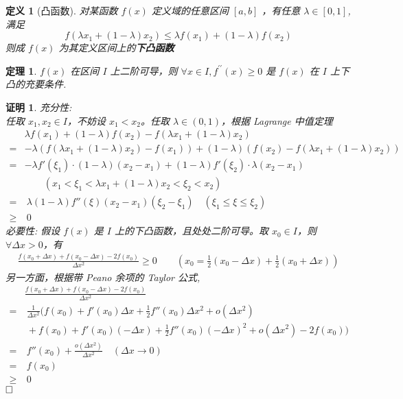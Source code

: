 \documentclass{ctexart}
\newcommand{\。}{．} %
\newcommand{\dds}{^{\prime\prime}}
\newenvironment{lvse}{
    \begin{tcolorbox}[enhanced, breakable, colback=qlv, boxrule=0pt, frame hidden,
        borderline west={0.7mm}{0.1mm}{slv}]
    }
    {\end{tcolorbox}}
\newenvironment{lanse}{
    \begin{tcolorbox}[enhanced, breakable, colback=qlan, boxrule=0pt, frame hidden,
        borderline west={0.7mm}{0.1mm}{slan}]
    }
    {\end{tcolorbox}}
\newenvironment{huangse}{
    \begin{tcolorbox}[enhanced, breakable, colback=qhuang, boxrule=0pt, frame hidden,
        borderline west={0.7mm}{0.1mm}{shuang}]
    }
    {\end{tcolorbox}}
\theoremstyle{t} %
\newtheorem{dyhj}{\color{slv} 定义}[subsection] %
\newtheorem{dlhj}{\color{shuang} 定理}[subsection]
\newtheorem*{zmhj}{\color{slan} 证明}
\newenvironment{dy}{\begin{lvse}\begin{dyhj}}{\end{dyhj}\end{lvse}}
\newenvironment{zm}{\begin{lanse}\begin{zmhj}}{$\hfill \square$\end{zmhj}\end{lanse}}
\newenvironment{dl}{\begin{huangse}\begin{dlhj}}{\end{dlhj}\end{huangse}}
\begin{document}
\begin{dy}[凸函数]
    对某函数 $f(x)$ 定义域的任意区间 $[a, b]$ ，有任意 $\lambda \in [0, 1]$, 满足
    \[
        f(\lambda x_1 + (1 - \lambda) x_2) \leq \lambda f(x_1) + (1 - \lambda) f(x_2)
    \]
    则成 $f(x)$ 为其定义区间上的\textbf{下凸函数}
\end{dy}

\begin{dl}
    $f(x)$ 在区间 $I$ 上二阶可导，则 $\forall x \in I, f\dds(x) \geqslant 0$ 是 $f(x)$ 在 $I$ 上下凸的充要条件. 
\end{dl}

\begin{zm}
    充分性: \\
    任取 $x_1, x_2 \in I$，不妨设 $x_1 < x_2$。任取 $\lambda \in (0,1)$，根据 Lagrange 中值定理
    \begin{align*}
        & \lambda f(x_1) + (1 - \lambda) f(x_2) - f(\lambda x_1 + (1 - \lambda)x_2) \\
        = & -\lambda \left( f(\lambda x_1 + (1 - \lambda)x_2) - f(x_1) \right) + (1 - \lambda) \left( f(x_2) - f(\lambda x_1 + (1 - \lambda)x_2) \right) \\
        = & -\lambda f'(\xi_1) \cdot (1 - \lambda)(x_2 - x_1) + (1 - \lambda)f'(\xi_2) \cdot \lambda(x_2 - x_1) \quad \\
        & \qquad (x_1 < \xi_1 < \lambda x_1 + (1 - \lambda)x_2 < \xi_2 < x_2) \\
        = & \ \lambda (1 - \lambda) f''(\xi) (x_2 - x_1)(\xi_2 - \xi_1) \quad (\xi_1 \leq \xi \leq \xi_2) \\
        \geqslant & \  0
    \end{align*}
    必要性: 假设 $f(x)$ 是 $I$ 上的下凸函数，且处处二阶可导。取 $x_0 \in I$，则 $\forall \Delta x > 0$，有
    \begin{align*}
        \frac{f(x_0 + \Delta x) + f(x_0 - \Delta x) - 2f(x_0)}{\Delta x^2} \geq 0 
        \qquad \left( x_0 = \frac{1}{2} (x_0 - \Delta x) + \frac{1}{2}(x_0 + \Delta x) \right)
    \end{align*}
    另一方面，根据带 Peano 余项的 Taylor 公式, 
    \begin{align*}
        & \frac{f(x_0 + \Delta x) + f(x_0 - \Delta x) - 2f(x_0)}{\Delta x^2} \\
        = & \ \frac{1}{\Delta x^2} \Bigg( f(x_0) + f'(x_0) \Delta x + \frac{1}{2} f''(x_0) \Delta x^2 + o(\Delta x^2)  \\
        & \  + f(x_0) + f'(x_0)(-\Delta x) + \frac{1}{2} f''(x_0)(-\Delta x)^2 + o(\Delta x^2) - 2f(x_0) \Bigg)\\
        = &\  f''(x_0) + \frac{o(\Delta x^2)}{\Delta x^2} \quad (\Delta x \to 0) \\
        = & \ f(x_0) \\
        \geqslant & \ 0
    \end{align*}
\end{zm}
\end{document}
